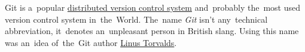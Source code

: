 \label{git}
Git is a~popular \hyperref[distributedversioncontrolsystem]{distributed version control system} and~probably the~most used version control system in~the~World.
The~name \textit{Git} isn't any~technical abbreviation, it~denotes an~unpleasant person in British slang.
Using this name was an~idea of~the~Git author \href{https://en.wikipedia.org/wiki/Linus_Torvalds}{Linus Torvalds}.

